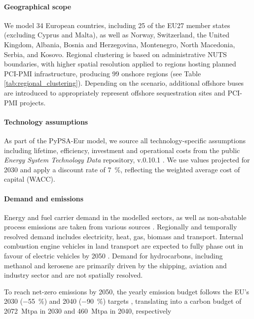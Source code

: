 \documentclass[preprint,12pt]{elsarticle}
\begin{document}
\paragraph{Geographical scope} 
\label{sec:geographical_scope}
We model 34 European countries, including 25 of the EU27 member states (excluding Cyprus and Malta), as well as Norway, Switzerland, the United Kingdom, Albania, Bosnia and Herzegovina, Montenegro, North Macedonia, Serbia, and Kosovo. Regional clustering is based on administrative NUTS boundaries, with higher spatial resolution applied to regions hosting planned PCI-PMI infrastructure, producing 99 onshore regions (see Table \ref{tab:regional_clustering}). Depending on the scenario, additional offshore buses are introduced to appropriately represent offshore sequestration sites and PCI-PMI projects.

\paragraph{Technology assumptions} 
\label{sec:technology_assumptions}
As part of the PyPSA-Eur model, we source all technology-specific assumptions including lifetime, efficiency, investment and operational costs from the public \textit{Energy System Technology Data} repository, v.0.10.1 \cite{zeyenPyPSATechnologydataV01012025}. We use values projected for 2030 and apply a discount rate of \SI{7}{\percent}, reflecting the weighted average cost of capital (WACC).

\paragraph{Demand and  emissions}
\label{sec:demand_and_co2_emissions}
Energy and fuel carrier demand in the modelled sectors, as well as non-abatable  process emissions are taken from various sources \cite{mantzosJRCIDEES20152018,eurostatCompleteEnergyBalances2022,manzGeoreferencedIndustrialSites2018,muehlenpfordtTimeSeries2019,krienOemofDemandlibV0222025}. Regionally and temporally resolved demand includes electricity, heat, gas, biomass and transport. Internal combustion engine vehicles in land transport are expected to fully phase out in favour of electric vehicles by 2050 \cite{zeyenShiftingBurdensHow2025a}. Demand for hydrocarbons, including methanol and kerosene are primarily driven by the shipping, aviation and industry sector and are not spatially resolved.

To reach net-zero  emissions by 2050, the yearly emission budget follows the EU's 2030 (\SI{-55}{\percent}) and 2040 (\SI{-90}{\percent}) targets \cite{europeancommissionFit55Delivering2021, europeancommission.directorategeneralforclimateaction.IndepthReportResults2024}, translating into a carbon budget of \SI{2072}{Mtpa} in 2030 and \SI{460}{Mtpa} in 2040, respectively
\end{document}
